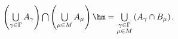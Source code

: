  $\left(\bigcup\limits_{\gamma\in \Gamma} A_\gamma\right)\bigcap
            \left(\bigcup\limits_{\mu\in M} A_\mu\right)\hm=\bigcup\limits_{\substack{\gamma\in \Gamma \\ \mu\in M}} \left(A_\gamma\cap B_\mu\right)$.
        